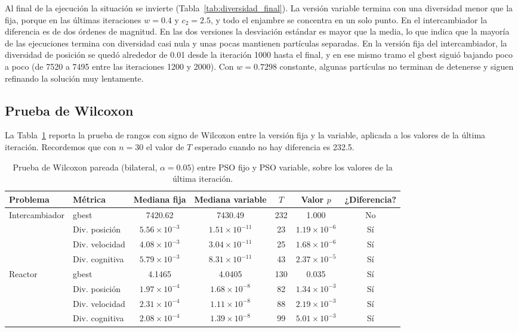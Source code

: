 Al final de la ejecución la situación se invierte (Tabla~\ref{tab:diversidad_final}). La versión variable termina con una diversidad menor que la fija, porque en las últimas iteraciones $w = 0.4$ y $c_2 = 2.5$, y todo el enjambre se concentra en un solo punto. En el intercambiador la diferencia es de dos órdenes de magnitud. En las dos versiones la desviación estándar es mayor que la media, lo que indica que la mayoría de las ejecuciones termina con diversidad casi nula y unas pocas mantienen partículas separadas. En la versión fija del intercambiador, la diversidad de posición se quedó alrededor de 0.01 desde la iteración 1000 hasta el final, y en ese mismo tramo el gbest siguió bajando poco a poco (de 7520 a 7495 entre las iteraciones 1200 y 2000). Con $w = 0.7298$ constante, algunas partículas no terminan de detenerse y siguen refinando la solución muy lentamente.

\subsection{Prueba de Wilcoxon}
\label{sec:res_wilcoxon}

La Tabla~\ref{tab:wilcoxon} reporta la prueba de rangos con signo de Wilcoxon entre la versión fija y la variable, aplicada a los valores de la última iteración. Recordemos que con $n = 30$ el valor de $T$ esperado cuando no hay diferencia es 232.5.

\begin{table}[H]
\centering
\caption{Prueba de Wilcoxon pareada (bilateral, $\alpha = 0.05$) entre PSO fijo y PSO variable, sobre los valores de la última iteración.}
\label{tab:wilcoxon}
\small
\setlength{\tabcolsep}{4pt}
\begin{adjustbox}{max width=\textwidth}
\begin{tabular}{llccccc}
\toprule
Problema & Métrica & Mediana fija & Mediana variable & $T$ & Valor $p$ & ¿Diferencia? \\
\midrule
\multirow{4}{*}{Intercambiador} & gbest & 7420.62 & 7430.49 & 232 & 1.000 & No \\
 & Div. posición & $5.56\times10^{-3}$ & $1.51\times10^{-11}$ & 23 & $1.19\times10^{-6}$ & Sí \\
 & Div. velocidad & $4.08\times10^{-3}$ & $3.04\times10^{-11}$ & 25 & $1.68\times10^{-6}$ & Sí \\
 & Div. cognitiva & $5.79\times10^{-3}$ & $8.31\times10^{-11}$ & 43 & $2.37\times10^{-5}$ & Sí \\
\midrule
\multirow{4}{*}{Reactor} & gbest & 4.1465 & 4.0405 & 130 & 0.035 & Sí \\
 & Div. posición & $1.97\times10^{-4}$ & $1.68\times10^{-8}$ & 82 & $1.34\times10^{-3}$ & Sí \\
 & Div. velocidad & $2.31\times10^{-4}$ & $1.11\times10^{-8}$ & 88 & $2.19\times10^{-3}$ & Sí \\
 & Div. cognitiva & $2.08\times10^{-4}$ & $1.39\times10^{-8}$ & 99 & $5.01\times10^{-3}$ & Sí \\
\bottomrule
\end{tabular}
\end{adjustbox}
\end{table}

